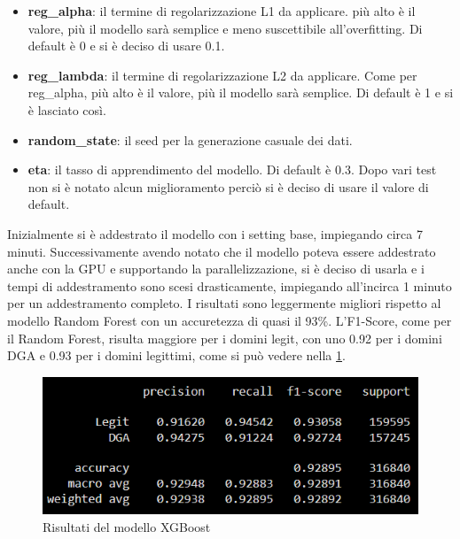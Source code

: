 \documentclass[12pt,a4paper,openright,twoside]{book}
\begin{document}
\begin{itemize}
    \item \textbf{reg\_alpha}: il termine di regolarizzazione L1 da applicare.
    più alto è il valore, più il modello sarà semplice e meno suscettibile all'overfitting.
    Di default è 0 e si è deciso di usare 0.1.
    \item \textbf{reg\_lambda}: il termine di regolarizzazione L2 da applicare.
    Come per reg\_alpha, più alto è il valore, più il modello sarà semplice.
    Di default è 1 e si è lasciato così.
    \item \textbf{random\_state}: il seed per la generazione casuale dei dati.
    \item \textbf{eta}: il tasso di apprendimento del modello.
    Di default è 0.3. Dopo vari test
    non si è notato alcun miglioramento perciò 
    si è deciso di usare il valore di default.
\end{itemize}

\noindent Inizialmente si è addestrato il modello con i setting base, impiegando circa 7 minuti. 
Successivamente avendo notato che il modello
poteva essere addestrato anche con la GPU e supportando la parallelizzazione, si è deciso di usarla
e i tempi di addestramento sono scesi drasticamente,
impiegando all'incirca 1 minuto per un addestramento completo.
I risultati sono leggermente migliori rispetto al modello Random Forest
con un accuretezza di quasi il 93\%. L'F1-Score, come per il Random Forest,
risulta maggiore per i domini legit,
con uno 0.92 per i domini DGA e 0.93 per i domini legittimi,
come si può vedere nella \cref{fig:XGBoost results}.
\begin{figure}[H]
    \centering
    \includegraphics[width=.8\linewidth]{figures/XGBoost_results.png}
    \caption{Risultati del modello XGBoost}
    \label{fig:XGBoost results}
\end{figure}
\end{document}

